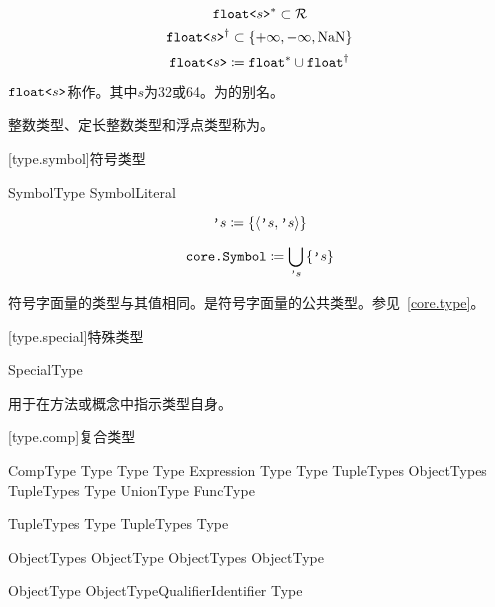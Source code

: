 $$ \texttt{float<}s\texttt{>}^\ast \subset \mathcal{R} $$
$$ \texttt{float<}s\texttt{>}^\dagger \subset \{ +\infty, -\infty, \mathrm{NaN} \} $$
$$ \texttt{float<}s\texttt{>} \coloneqq \texttt{float}^\ast \cup \texttt{float}^\dagger $$

\pnum
$\texttt{float<}s\texttt{>}$称作。其中$s$为32或64。为的别名。

\pnum
整数类型、定长整数类型和浮点类型称为。

[type.symbol]{符号类型}

\begin{bnf}{SymbolType}
    SymbolLiteral
\end{bnf}

$$ \texttt{'}s \coloneqq \left\{ \langle \texttt{'}s, \texttt{'}s \rangle \right\} $$

$$ \texttt{core.Symbol} \coloneqq \bigcup_{\texttt{'}s} \left\{  \texttt{'}s \right\} $$

\pnum
符号字面量的类型与其值相同。是符号字面量的公共类型。参见~\ref{core.type}。

[type.special]{特殊类型}

\begin{bnf}{SpecialType}
\end{bnf}

\pnum
{}用于在方法或概念中指示类型自身。

[type.comp]{复合类型}

\begin{bnf}{CompType}
    Type  \br
    Type \terminal{[} \terminal{]} \br
    Type \terminal{[}  Expression \terminal{]} \br
    Type \terminal{[} Type \terminal{]} \br
    \terminal{(} TupleTypes\bnfs \terminal{)} \br
    \terminal{\{} ObjectTypes \terminal{\}} \br
    \terminal{(} TupleTypes\bnfs \terminal{)} \terminal{->} Type \br
    UnionType \br
    FuncType
\end{bnf}

\begin{bnf}{TupleTypes}
    Type \br
    TupleTypes \terminal{,} Type
\end{bnf}

\begin{bnf}{ObjectTypes}
    ObjectType \br
    ObjectTypes \terminal{,} ObjectType
\end{bnf}

\begin{bnf}{ObjectType}
    ObjectTypeQualifier\bnfs Identifier \terminal{:} Type
\end{bnf}

